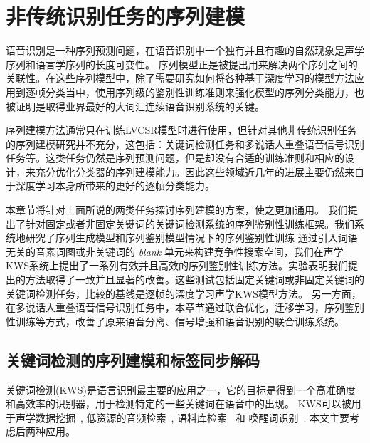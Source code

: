 

\chapter{非传统识别任务的序列建模}
\label{chap:seqtrain}

语音识别是一种序列预测问题，在语音识别中一个独有并且有趣的自然现象是声学序列和语言学序列的长度可变性。
序列模型正是被提出用来解决两个序列之间的关联性。在这些序列模型中，除了需要研究如何将各种基于深度学习的模型方法应用到逐帧分类当中，使用序列级的鉴别性训练准则来强化模型的序列分类能力，也被证明是取得业界最好的大词汇连续语音识别系统的关键。


序列建模方法通常只在训练LVCSR模型时进行使用，但针对其他非传统识别任务的序列建模研究并不充分，这包括：关键词检测任务和多说话人重叠语音信号识别任务等。这类任务仍然是序列预测问题，但是却没有合适的训练准则和相应的设计，来充分优化分类器的序列建模能力。因此这些领域近几年的进展主要仍然来自于深度学习本身所带来的更好的逐帧分类能力。

本章节将针对上面所说的两类任务探讨序列建模的方案，使之更加通用。
我们提出了针对固定或者非固定关键词的关键词检测系统的序列鉴别性训练框架。我们系统地研究了序列生成模型和序列鉴别模型情况下的序列鉴别性训练
通过引入词语无关的音素词图或非关键词的 {\em blank} 单元来构建竞争性搜索空间，我们在声学KWS系统上提出了一系列有效并且高效的序列鉴别性训练方法。实验表明我们提出的方法取得了一致并且显著的改善。这些测试包括固定关键词或非固定关键词的关键词检测任务，比较的基线是逐帧的深度学习声学KWS模型方法。
%
另一方面，在多说话人重叠语音信号识别任务中，本章节通过联合优化，迁移学习，序列鉴别性训练等方式，改善了原来语音分离、信号增强和语音识别的联合训练系统。


\section{关键词检测的序列建模和标签同步解码}
\label{chap:kws}


关键词检测(KWS)是语言识别最主要的应用之一，它的目标是得到一个高准确度和高效率的识别器，用于检测特定的一些关键词在语音中的出现。
KWS可以被用于声学数据挖掘~\cite{zhou2005data}, 低资源的音频检索~\cite{shen2009comparison}, 
语料库检索~\cite{garofolo2000trec} 和 唤醒词识别~\cite{chen2014small}. 本文主要考虑后两种应用。

